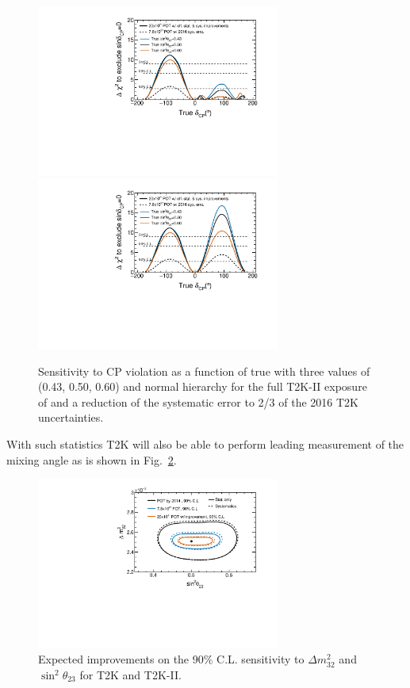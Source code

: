 \begin{figure} [htbp!]
\begin{center}
\includegraphics[width=8cm]{figures/t2kpre_dcp_point1_100k4check_100ksensi_wreactorthrow_optv2s13off_truedcp_unknownMH_fakesyst_lohidcpExclusive.pdf}
\includegraphics[width=8cm]{figures/t2kpre_dcp_point1_100k4check_100ksensi_wreactorthrow_optv2s13off_truedcp_fakesyst_lohidcpExclusive.pdf}
\caption{\label{fig:t2k2sensi} Sensitivity to CP violation as a function of true
\dcp with three values of \stt (0.43, 0.50, 0.60) and normal hierarchy for the full T2K-II exposure of \twopott and a reduction of the systematic error to 2/3 of the 2016 T2K uncertainties.}
\end{center}
\end{figure}

With such statistics T2K will also be able to perform leading measurement of the \stt mixing angle as is shown in Fig.~\ref{fig:t2k2th23}.

\begin{figure} [htbp!]
\begin{center}
\includegraphics[width=8cm]{figures/t2kpre_t23dm32_point1_wreactorthrow.pdf}
\caption{\label{fig:t2k2th23} Expected improvements on the 90\% C.L. sensitivity to $\Delta m^2_{32}$ and $\sin^2\theta_{23}$
for T2K and T2K-II.}
\end{center}
\end{figure}

